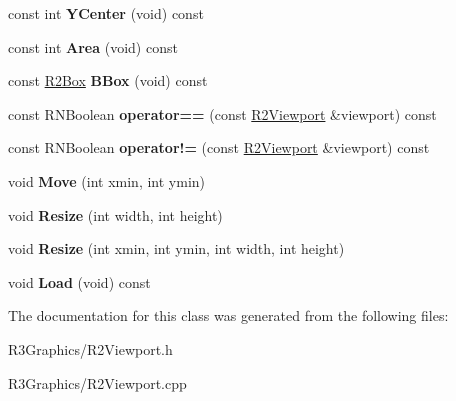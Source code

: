 \begin{DoxyCompactItemize}
\item 
const int {\bfseries Y\+Center} (void) const \hypertarget{class_r2_viewport_a6d6be65c7219855ff691dc29fe262179}{}\label{class_r2_viewport_a6d6be65c7219855ff691dc29fe262179}

\item 
const int {\bfseries Area} (void) const \hypertarget{class_r2_viewport_a20f15da612067b1862eaa57603fc6ee3}{}\label{class_r2_viewport_a20f15da612067b1862eaa57603fc6ee3}

\item 
const \hyperlink{class_r2_box}{R2\+Box} {\bfseries B\+Box} (void) const \hypertarget{class_r2_viewport_a44eae848c3b4fd3025bfdc4ac1ee0a3a}{}\label{class_r2_viewport_a44eae848c3b4fd3025bfdc4ac1ee0a3a}

\item 
const R\+N\+Boolean {\bfseries operator==} (const \hyperlink{class_r2_viewport}{R2\+Viewport} \&viewport) const \hypertarget{class_r2_viewport_a46f10ebb4a2178ba7ef8c40e895037af}{}\label{class_r2_viewport_a46f10ebb4a2178ba7ef8c40e895037af}

\item 
const R\+N\+Boolean {\bfseries operator!=} (const \hyperlink{class_r2_viewport}{R2\+Viewport} \&viewport) const \hypertarget{class_r2_viewport_ae16d1b84cba6c504d7cf7433bf84367f}{}\label{class_r2_viewport_ae16d1b84cba6c504d7cf7433bf84367f}

\item 
void {\bfseries Move} (int xmin, int ymin)\hypertarget{class_r2_viewport_ad318211597314045fe3a58006ba4019c}{}\label{class_r2_viewport_ad318211597314045fe3a58006ba4019c}

\item 
void {\bfseries Resize} (int width, int height)\hypertarget{class_r2_viewport_a97dcbf74df41aeb3e0d7f682f3cb6c43}{}\label{class_r2_viewport_a97dcbf74df41aeb3e0d7f682f3cb6c43}

\item 
void {\bfseries Resize} (int xmin, int ymin, int width, int height)\hypertarget{class_r2_viewport_a8dca87e845620ff7152581a006b42567}{}\label{class_r2_viewport_a8dca87e845620ff7152581a006b42567}

\item 
void {\bfseries Load} (void) const \hypertarget{class_r2_viewport_ad4cddf1bb82f7f7ee2a39513dd4d0ac7}{}\label{class_r2_viewport_ad4cddf1bb82f7f7ee2a39513dd4d0ac7}

\end{DoxyCompactItemize}


The documentation for this class was generated from the following files\+:\begin{DoxyCompactItemize}
\item 
R3\+Graphics/R2\+Viewport.\+h\item 
R3\+Graphics/R2\+Viewport.\+cpp\end{DoxyCompactItemize}
